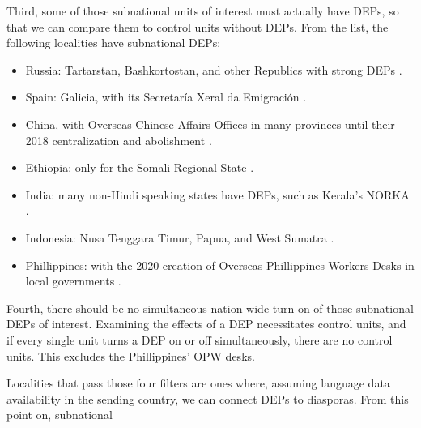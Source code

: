 \documentclass[doublespace,nopageskip]{UVAthesis}
\begin{document}
    Third, some of those subnational units of interest must actually have DEPs, so that we can compare them to control units without DEPs. From the list, the following localities have subnational DEPs:
    \begin{itemize}
        \item Russia: Tartarstan, Bashkortostan, and other Republics with strong DEPs \citep{albina_external_2010}.
        \item Spain: Galicia, with its Secretaría Xeral da Emigración \citep{noauthor_galiciaaberta_nodate}.
        \item China, with Overseas Chinese Affairs Offices in many provinces until their 2018 centralization and abolishment \citep{guotu_chinas_2013}.
        \item Ethiopia: only for the Somali Regional State \citep{berhanu_ethiopian_2019}.
        \item India: many non-Hindi speaking states have DEPs, such as Kerala's NORKA \citep{rajan_assessment_2012}.
        \item Indonesia: Nusa Tenggara Timur, Papua, and West Sumatra \citep{noauthor_dinas_nodate, noauthor_badan_nodate, noauthor_portal_nodate}.
        \item Phillippines: with the 2020 creation of Overseas Phillippines Workers Desks in local governments \citep{noauthor_dilg_nodate}.
    \end{itemize}

     Fourth, there should be no simultaneous nation-wide turn-on of those subnational DEPs of interest. Examining the effects of a DEP necessitates control units, and if every single unit turns a DEP on or off simultaneously, there are no control units. This excludes the Phillippines' OPW desks. 
     
     Localities that pass those four filters are ones where, assuming language data availability in the sending country, we can connect DEPs to diasporas. From this point on, subnational 
    
\end{document}
